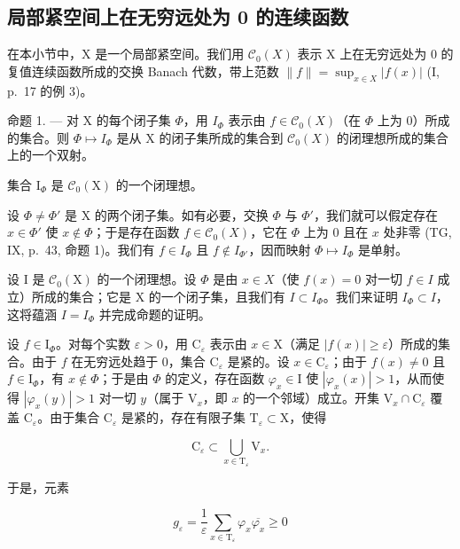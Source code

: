 \subsection{局部紧空间上在无穷远处为 0 的连续函数}

在本小节中，X 是一个局部紧空间。我们用 \(\mathcal{C}_{0}(X)\) 表示 X 上在无穷远处为 0 的复值连续函数所成的交换 Banach 代数，带上范数 \(\|f\|=\sup_{x\in X}|f(x)|\) (I, p.~17 的例 3)。

命题 1. --- 对 X 的每个闭子集 \(\Phi\)，用 \(I_{\Phi}\) 表示由 \(f \in \mathcal{C}_0(X)\)（在 \(\Phi\) 上为 0）所成的集合。则 \(\Phi \mapsto I_{\Phi}\) 是从 X 的闭子集所成的集合到 \(\mathcal{C}_0(X)\) 的闭理想所成的集合上的一个双射。

集合 \(\mathrm{I}_{\Phi}\) 是 \(\mathcal{C}_0(\mathrm{X})\) 的一个闭理想。

设 \(\Phi \neq \Phi'\) 是 X 的两个闭子集。如有必要，交换 \(\Phi\) 与 \(\Phi'\)，我们就可以假定存在 \(x \in \Phi'\) 使 \(x \notin \Phi\)；于是存在函数 \(f \in \mathcal{C}_0(X)\)，它在 \(\Phi\) 上为 0 且在 \(x\) 处非零 (TG, IX, p.~43, 命题 1)。我们有 \(f \in I_{\Phi}\) 且 \(f \notin I_{\Phi'}\)，因而映射 \(\Phi \mapsto I_{\Phi}\) 是单射。

设 I 是 \(\mathcal{C}_{0}(\mathrm{X})\) 的一个闭理想。设 \(\Phi\) 是由 \(x \in X\)（使 \(f(x) = 0\) 对一切 \(f \in I\) 成立）所成的集合；它是 X 的一个闭子集，且我们有 \(I \subset I_{\Phi}\)。我们来证明 \(I_{\Phi} \subset I\)，这将蕴涵 \(I = I_{\Phi}\) 并完成命题的证明。

设 \(f \in \mathrm{I}_{\Phi}\)。对每个实数 \(\varepsilon > 0\)，用 \(\mathrm{C}_{\varepsilon}\) 表示由 \(x \in \mathrm{X}\)（满足 \(|f(x)| \geqslant \varepsilon\)）所成的集合。由于 \(f\) 在无穷远处趋于 0，集合 \(\mathrm{C}_{\varepsilon}\) 是紧的。设 \(x \in \mathrm{C}_{\varepsilon}\)；由于 \(f(x) \neq 0\) 且 \(f \in \mathrm{I}_{\Phi}\)，有 \(x \notin \Phi\)；于是由 \(\Phi\) 的定义，存在函数 \(\varphi_x \in \mathrm{I}\) 使 \(|\varphi_x(x)| > 1\)，从而使得 \(|\varphi_x(y)| > 1\) 对一切 \(y\)（属于 \(\mathrm{V}_x\)，即 \(x\) 的一个邻域）成立。开集 \(\mathrm{V}_x \cap \mathrm{C}_{\varepsilon}\) 覆盖 \(\mathrm{C}_{\varepsilon}\)。由于集合 \(\mathrm{C}_{\varepsilon}\) 是紧的，存在有限子集 \(\mathrm{T}_{\varepsilon} \subset \mathrm{X}\)，使得

\[
\mathrm{C} _ {\varepsilon} \subset \bigcup_ {x \in \mathrm{T} _ {\varepsilon}} \mathrm{V} _ {x}.
\]

于是，元素

\[
g _ {\varepsilon} = \frac {1}{\varepsilon} \sum_ {x \in \mathrm{T} _ {\varepsilon}} \varphi_ {x} \overline {{\varphi_ {x}}} \geqslant 0
\]

